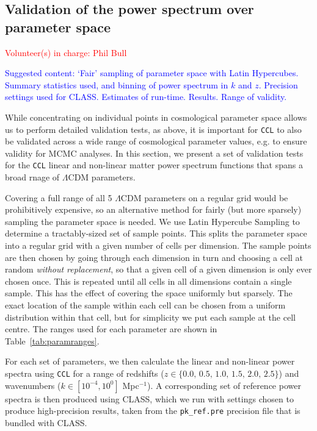 \documentclass[\docopts]{\docclass}
\newcommand{\vol}[1]{\textcolor{red}{Volunteer(s) in charge: #1}}
\newcommand{\cont}[1]{\textcolor{blue}{Suggested content: #1}}
\newcommand{\ccl}{{\tt CCL}\xspace}
\begin{document}
\subsection{Validation of the power spectrum over parameter space}
\vol{Phil Bull}

\cont{ `Fair' sampling of parameter space with Latin Hypercubes. Summary statistics used, and binning of power spectrum in $k$ and $z$. Precision settings used for CLASS. Estimates of run-time. Results. Range of validity.}

While concentrating on individual points in cosmological parameter space allows us to perform detailed validation tests, as above, it is important for \ccl to also be validated across a wide range of cosmological parameter values, e.g. to ensure validity for MCMC analyses. In this section, we present a set of validation tests for the \ccl linear and non-linear matter power spectrum functions that spans a broad rnage of $\Lambda$CDM parameters.

Covering a full range of all 5 $\Lambda$CDM parameters on a regular grid would be prohibitively expensive, so an alternative method for fairly (but more sparsely) sampling the parameter space is needed. We use Latin Hypercube Sampling to determine a tractably-sized set of sample points. This splits the parameter space into a regular grid with a given number of cells per dimension. The sample points are then chosen by going through each dimension in turn and choosing a cell at random {\it without replacement}, so that a given cell of a given dimension is only ever chosen once. This is repeated until all cells in all dimensions contain a single sample. This has the effect of covering the space uniformly but sparsely. The exact location of the sample within each cell can be chosen from a uniform distribution within that cell, but for simplicity we put each sample at the cell centre. The ranges used for each parameter are shown in Table~\ref{tab:paramranges}.

For each set of parameters, we then calculate the linear and non-linear power spectra using \ccl for a range of redshifts ($z \in \{ 0.0,\, 0.5,\, 1.0,\, 1.5,\, 2.0,\, 2.5\}$) and wavenumbers ($k \in [10^{-4}, 10^0]$ Mpc$^{-1}$). A corresponding set of reference power spectra is then produced using CLASS, which we run with settings chosen to produce high-precision results, taken from the {\tt pk\_ref.pre} precision file that is bundled with CLASS.
\end{document}
